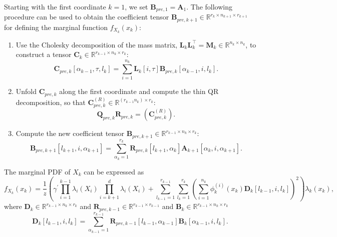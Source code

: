 \begin{prop}
	\label{prob:ForMarg}
	Starting with the first coordinate $k = 1$, we set $\bm{B}_{pre,1} = \bm{A}_1$. The following procedure can be used to obtain the coefficient tensor $\bm{B}_{pre,k+1} \in \mathbb{R}^{r_{k} \times n_{k+1} \times r_{k+1}}$ for defining the marginal function $f_{X_k}(x_k)$:
	\begin{enumerate}
		\item Use the Cholesky decomposition of the mass matrix, $\bm{L}_k \bm{L}_k^\top = \bm{M}_k \in \mathbb{R}^{n_k \times n_k}$, to construct a tensor $\bm{C}_k \in \mathbb{R}^{r_{k-1} \times n_k \times r_k}$:
		\begin{equation}
			\bm{C}_{pre,k}[\alpha_{k-1}, \tau, l_k] = \sum_{i=1}^{n_k} \bm{L}_k[i, \tau] \bm{B}_{pre,k}[\alpha_{k-1}, i, l_k] .
		\end{equation}
		\item Unfold $\bm{C}_{pre,k}$ along the first coordinate and compute the thin QR decomposition, so that $\bm{C}_{pre,k}^{(R)} \in \mathbb{R}^{(r_{k-1} n_k ) \times r_k}$:
		\begin{equation}
			\bm{Q}_{pre,k}\bm{R}_{pre,k} = {(\bm{C}_{pre,k}^{(R)})}.
		\end{equation}
		\item Compute the new coefficient tensor $\bm{B}_{pre, k+1} \in \mathbb{R}^{r_{k-1} \times n_k \times r_k} $:
		\begin{equation}
			\bm{B}_{pre, k+1}[l_{k+1}, i, \alpha_{k+1}] = \sum_{\alpha_{k}=1}^{r_{k}} \bm{R}_{pre,k}[l_{k+1}, \alpha_{k}] \bm{A}_{k+1}[\alpha_{k}, i, \alpha_{k+1}] .
		\end{equation}
	\end{enumerate}
\end{prop}

The marginal PDF of $X_{k}$ can be expressed as
\begin{equation}
	f_{X_k}(x_k) = \frac{1}{z} \left(\gamma^{\prime} \prod_{i=1}^{k-1} \lambda_i(X_i) \prod_{i=k+1}^{d} \lambda_i(X_i) + \sum_{l_{k-1}=1}^{r_{k-1}} \sum_{l_k=1}^{r_k} \left(\sum_{i=1}^{n_k} \phi^{(i)}_k(x_k) \bm{D}_k[l_{k-1},i, l_k] \right)^2 \right) \lambda_k(x_k),
\end{equation}
where $\bm{D}_k \in \mathbb{R}^{r_{k-1} \times n_k \times r_k}$ and $\bm{R}_{pre,k-1}\in \mathbb{R}^{r_{k-1} \times r_{k-1}}$ and $\bm{B}_k \in \mathbb{R}^{r_{k-1} \times n_k \times r_k}$
\begin{equation}
	\bm{D}_k[l_{k-1},i,l_k] = \sum_{\alpha_{k-1}=1}^{r_{k-1}}  \bm{R}_{pre,k-1}[l_{k-1}, \alpha_{k-1}] \bm{B}_k[\alpha_{k-1}, i, l_k].
\end{equation}



